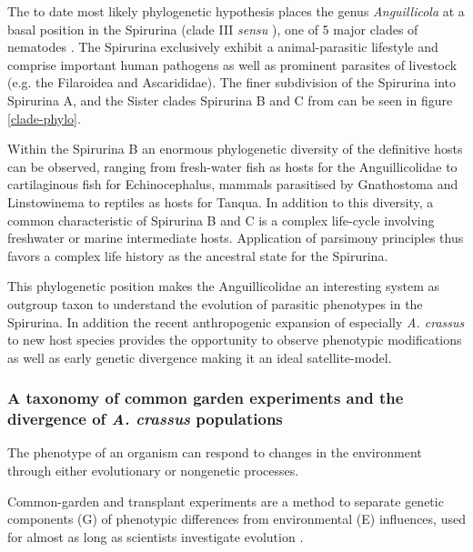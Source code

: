 The to date most likely phylogenetic hypothesis places the genus
\textit{Anguillicola} at a basal position in the Spirurina (clade III
\textit{sensu} \cite{blaxter_molecular_1998}), one of 5 major clades
of nematodes \cite{nadler_molecular_2007,
  wijov_evolutionary_2006}. The Spirurina exclusively exhibit a
animal-parasitic lifestyle and comprise important human pathogens as
well as prominent parasites of livestock (e.g. the Filaroidea and
Ascarididae). The finer subdivision of the Spirurina into Spirurina A,
and the Sister clades Spirurina B and C from \cite{dl_py} can be seen
in figure \ref{clade-phylo}.


Within the Spirurina B an enormous phylogenetic diversity of the
definitive hosts can be observed, ranging from fresh-water fish as
hosts for the Anguillicolidae to cartilaginous fish for
Echinocephalus, mammals parasitised by Gnathostoma and Linstowinema to
reptiles as hosts for Tanqua. In addition to this diversity, a common
characteristic of Spirurina B and C is a complex life-cycle involving
freshwater or marine intermediate hosts. Application of parsimony
principles thus favors a complex life history as the ancestral state
for the Spirurina.

This phylogenetic position makes the Anguillicolidae an interesting
system as outgroup taxon to understand the evolution of parasitic
phenotypes in the Spirurina. In addition the recent anthropogenic
expansion of especially \textit{A. crassus} to new host species
provides the opportunity to observe phenotypic modifications as well
as early genetic divergence making it an ideal satellite-model.

\subsubsection{A taxonomy of common garden experiments and the
  divergence of \textit{A. crassus} populations}
\label{div-ac}

The phenotype of an organism can respond to changes in the environment
through either evolutionary or nongenetic processes.

Common-garden and transplant experiments are a method to separate
genetic components (G) of phenotypic differences from environmental
(E) influences, used for almost as long as scientists investigate
evolution \cite{kerner_classic_common_garden,
  bonnier_classic_common_garden}.

